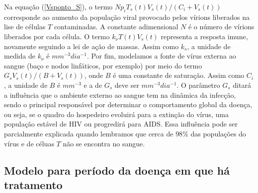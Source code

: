 Na equação (\ref{Vsponto_S}), o termo \( N p_{ i } T_{ s } ( t ) V_{ s } ( t ) / ( C_{ i } + V_{ s } ( t ) ) \) corresponde ao aumento da população viral provocado pelos vírions liberados na lise de células \( T \) contaminadas.
A constante adimensional \( N \) é o número de vírions liberados por cada célula.
O termo \( k_{ \nu } T ( t ) V_{ s } ( t ) \) representa a resposta imune, novamente seguindo a lei de ação de massas.
Assim como \( k_{ s } \), a unidade de medida de \( k_{ \nu } \) é \( \unit{mm^{ -3 } dia^{ -1 }} \).
Por fim, modelamos a fonte de vírus externa ao sangue (baço e nodos linfáticos, por exemplo) por meio do termo \( G_{ s } V_{ s } ( t ) / ( B + V_{ s } ( t ) ) \), onde \( B \) é uma constante de saturação.
Assim como \( C_{ i } \), a unidade de \( B \) é \( \unit{mm^{ -3 }} \) e a de \( G_{ s } \) deve ser \( \unit{mm^{ -3 } dia^{ -1 }} \).
O parâmetro \( G_{ s } \) ditará a influência que o ambiente externo ao sangue tem na dinâmica da infecção, sendo o principal responsável por determinar o comportamento global da doença, ou seja, se o quadro do hospedeiro evoluirá para a extinção do vírus, uma população estável de HIV ou progredirá para AIDS.
Essa influência pode ser parcialmente explicada quando lembramos que cerca de \( 98 \% \) das populações do vírus e de céluas \( T \) não se encontra no sangue.

\subsection{Modelo para período da doença em que há tratamento}

